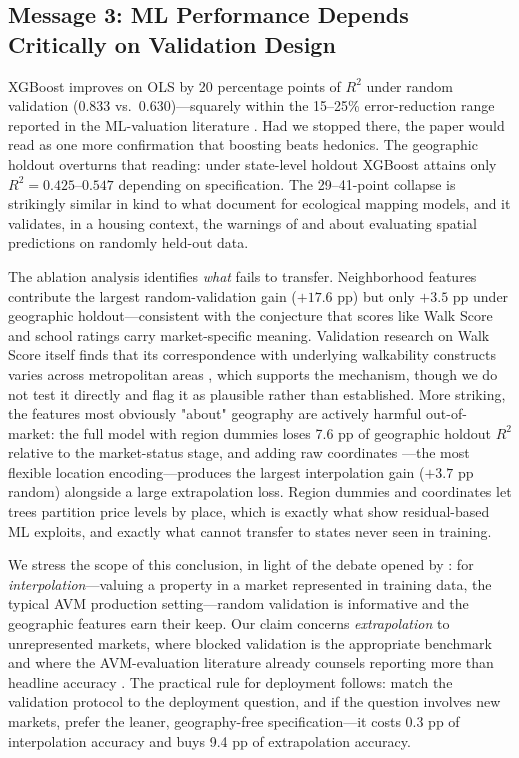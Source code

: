 \subsection{Message 3: ML Performance Depends Critically on Validation Design}

XGBoost improves on OLS by 20 percentage points of $R^2$ under random validation
(0.833 vs.\ 0.630)---squarely within the 15--25\% error-reduction range reported in
the ML-valuation literature \citep{bourassa2010predicting, park2015using,
chen2016xgboost}. Had we stopped there, the paper would read as one more
confirmation that boosting beats hedonics. The geographic holdout overturns that
reading: under state-level holdout XGBoost attains only $R^2 = 0.425$--$0.547$
depending on specification. The 29--41-point collapse is strikingly similar in
kind to what \citet{ploton2020spatial} document for ecological mapping models,
and it validates, in a housing context, the warnings of \citet{roberts2017cross}
and \citet{meyer2021predicting} about evaluating spatial predictions on randomly
held-out data.

The ablation analysis identifies \emph{what} fails to transfer. Neighborhood
features contribute the largest random-validation gain ($+17.6$ pp) but only
$+3.5$ pp under geographic holdout---consistent with the conjecture that scores
like Walk Score and school ratings carry market-specific meaning. Validation
research on Walk Score itself finds that its correspondence with underlying
walkability constructs varies across metropolitan areas
\citep{duncan2011validation}, which supports the mechanism, though we do not
test it directly and flag it as plausible rather than established.
More striking, the features most obviously "about" geography are actively harmful
out-of-market: the full model with region dummies loses 7.6 pp of geographic
holdout $R^2$ relative to the market-status stage, and adding raw coordinates
---the most flexible location encoding---produces the largest interpolation gain
($+3.7$ pp random) alongside a large extrapolation loss. Region dummies and
coordinates let trees partition price levels by place, which is exactly what
\citet{pace2020examining} show residual-based ML exploits, and exactly what cannot
transfer to states never seen in training.

We stress the scope of this conclusion, in light of the debate opened by
\citet{wadoux2021spatial}: for \emph{interpolation}---valuing a property in a
market represented in training data, the typical AVM production setting---random
validation is informative and the geographic features earn their keep. Our claim
concerns \emph{extrapolation} to unrepresented markets, where blocked validation
is the appropriate benchmark \citep{valavi2019blockcv, meyer2021predicting} and
where the AVM-evaluation literature already counsels reporting more than headline
accuracy \citep{steurer2021metrics}. The practical rule for deployment follows:
match the validation protocol to the deployment question, and if the question
involves new markets, prefer the leaner, geography-free specification---it costs
0.3 pp of interpolation accuracy and buys 9.4 pp of extrapolation accuracy.

